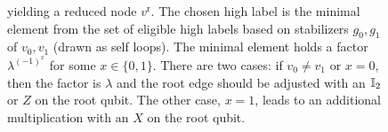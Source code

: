 \begin{figure}
{        yielding a reduced node $v^{\text{r}}$.
The chosen high label is the minimal element from the set of eligible high labels
based on stabilizers $g_0,g_1$ of $v_0,v_1$ (drawn as self loops).
The minimal element holds a factor $\lambda^{(-1)^x}$ for some $x \in \{0, 1\}$.
There are two cases: if $v_0 \neq v_1$ or $x=0$, then the factor is $\lambda$ and the root edge should be adjusted with an $\id[2]$ or $Z$ on the root qubit.
The other case, $x=1$, leads to an additional multiplication with an $X$ on the root qubit.
}
	\label{fig:reduced}
\end{figure}


